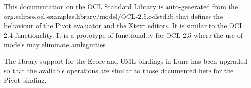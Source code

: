 \documentclass{scrreprt}   %
\begin{document}

\label{ocl:AbstractSyntax}


\label{ocl:EssentialOCLConcreteSyntax}




\label{ocl:CompleteOCLConcreteSyntax}



\label{ocl:EvaluationSemantics}


This documentation on the OCL Standard Library is auto-generated from the
org.eclipse.ocl.examples.library/model/OCL-2.5.oclstdlib that defines
the behaviour of the Pivot evaluator and the Xtext editors. It is similar to the OCL 2.4 functionality.
It is a prototype of functionality for OCL 2.5 where the use of models may eliminate ambiguities.
		
The library support for the Ecore and UML bindings in Luna has been upgraded so that the available operations
are similar to those documented here for the Pivot binding.





\end{document}
